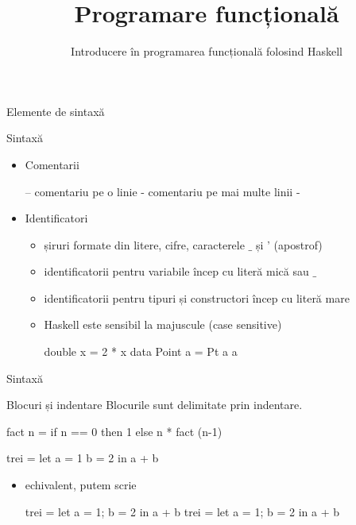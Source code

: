 \documentclass[xcolor=pdftex,romanian,colorlinks]{beamer}
\title[PF---Introducere]{Programare funcțională }
\subtitle{Introducere în programarea funcțională folosind Haskell}
\date{}
\begin{document}
\begin{frame}
  \titlepage
\end{frame}

\begin{frame}
\frametitle{}
\tableofcontents
\end{frame}

\begin{section}{Elemente de sintaxă}
\begin{frame}[fragile]{Sintaxă}
\begin{itemize}
\item Comentarii  
\small{\begin{asciihs}
-- comentariu pe o linie
{-  comentariu pe
    mai multe
    linii -}
\end{asciihs}}
\item Identificatori
\begin{itemize}
\item șiruri formate din litere, cifre, caracterele $\_$ și ' (apostrof)

\item identificatorii pentru variabile încep cu literă mică sau $\_$
\item identificatorii pentru tipuri și constructori încep cu literă mare
\item  Haskell este sensibil la majuscule (case sensitive)
\begin{asciihs}
double x =  2 * x
data Point a = Pt a a
\end{asciihs}
\end{itemize}
\end{itemize}

\end{frame}

\begin{frame}[fragile]{Sintaxă}
\begin{block}{Blocuri și indentare}
Blocurile sunt delimitate prin indentare.
\end{block}


\begin{asciihs}
fact n =  if n == 0
             then 1
             else  n * fact (n-1)

\end{asciihs}

\pause

\begin{asciihs}
trei =  let
             a = 1
             b = 2
        in a + b


\end{asciihs}
\pause
\begin{itemize}
\item echivalent, putem scrie
\begin{asciihs}
trei  =  let {a = 1; b = 2} in a + b
trei  =  let a = 1; b = 2 in a + b
\end{asciihs}
\end{itemize}
\end{frame}

\end{section}
\end{document}
